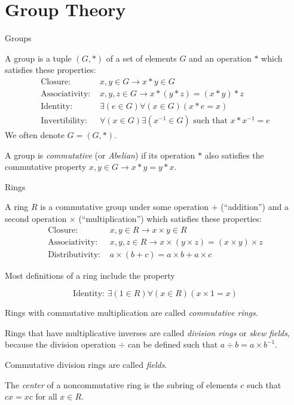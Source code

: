 \section{Group Theory}

\begin{mybox}{Groups}

A group is a tuple $(G, *)$ of a set of elements $G$ and an operation $*$ which satisfies these properties:
\begin{align*}
\text{Closure: }&x,y \in G \rightarrow x * y \in G\\
\text{Associativity: }&x,y,z \in G \rightarrow x * (y * z) = (x * y) * z\\
\text{Identity: }&\exists (e \in G) \forall (x \in G) (x * e = x)\\
\text{Invertibility: }&\forall (x \in G) \exists (x^{-1} \in G) \text{ such that } x * x^{-1} = e
\end{align*} We often denote $G = (G, *)$.

A group is \textit{commutative} (or \textit{Abelian}) if its operation $*$ also satisfies the commutative property $ x,y \in G \rightarrow x * y = y * x$.

\end{mybox}

\begin{mybox}{Rings}

A ring $R$ is a commutative group under some operation $+$ (``addition'') and a second operation $\times$ (``multiplication'') which satisfies these properties:
\begin{align*}
\text{Closure: }&x,y \in R \rightarrow x \times y \in R\\
\text{Associativity: }&x,y,z \in R \rightarrow x \times (y \times z) = (x \times y) \times z\\
\text{Distributivity: }&a\times (b + c) = a \times b + a \times c
\end{align*}

Most definitions of a ring include the property

$$\text{Identity: }\exists (1 \in R) \forall (x \in R) (x \times 1 = x)$$

Rings with commutative multiplication are called \textit{commutative rings}.

Rings that have multiplicative inverses are called \textit{division rings} or \textit{skew fields}, because the division operation $\div$ can be defined such that $a \div b = a \times b^{-1}$.

Commutative division rings are called \textit{fields}.

The \textit{center} of a noncommutative ring is the subring of elements $c$ such that $cx=xc$ for all $x\in R$.

\end{mybox}

